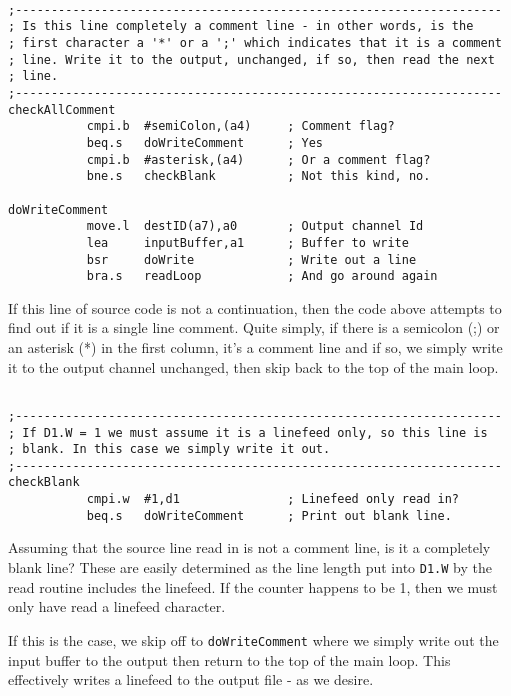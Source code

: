 \begin{lstlisting}[firstnumber=183,caption={ASMReformat Source - Comment Lines}]

;--------------------------------------------------------------------
; Is this line completely a comment line - in other words, is the 
; first character a '*' or a ';' which indicates that it is a comment
; line. Write it to the output, unchanged, if so, then read the next
; line.
;--------------------------------------------------------------------
checkAllComment
           cmpi.b  #semiColon,(a4)     ; Comment flag?
           beq.s   doWriteComment      ; Yes
           cmpi.b  #asterisk,(a4)      ; Or a comment flag?
           bne.s   checkBlank          ; Not this kind, no.

doWriteComment
           move.l  destID(a7),a0       ; Output channel Id
           lea     inputBuffer,a1      ; Buffer to write
           bsr     doWrite             ; Write out a line
           bra.s   readLoop            ; And go around again
\end{lstlisting}

If this line of source code is not a continuation, then the code above attempts to find out if it is a single line comment. Quite simply, if there is a semicolon (;) or an asterisk (*) in the first column, it's a comment line and if so, we simply write it to the output channel unchanged, then skip back to the top of the main loop.


\begin{lstlisting}[firstnumber=last,caption={ASMReformat Source - Checking for Blank Lines}]

;--------------------------------------------------------------------
; If D1.W = 1 we must assume it is a linefeed only, so this line is
; blank. In this case we simply write it out.
;--------------------------------------------------------------------
checkBlank
           cmpi.w  #1,d1               ; Linefeed only read in?
           beq.s   doWriteComment      ; Print out blank line.
\end{lstlisting}

Assuming that the source line read in is not a comment line, is it a completely blank line? These are easily determined as the line length put into \texttt{D1.W} by the read routine includes the linefeed. If the counter happens to be 1, then we must only have read a linefeed character.

If this is the case, we skip off to \texttt{doWriteComment} where we simply write out the input buffer to the output then return to the top of the main loop. This effectively writes a linefeed to the output file - as we desire.

